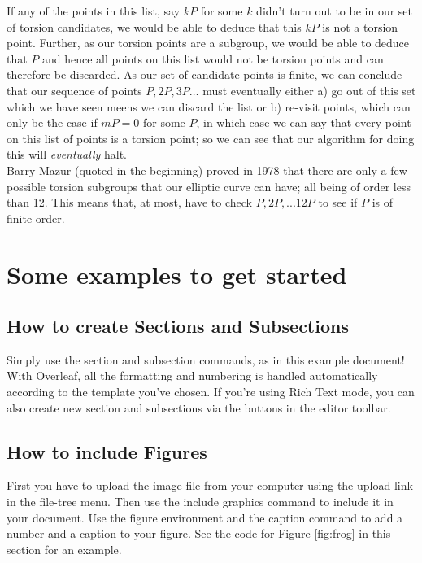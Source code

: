 \documentclass{article}
\begin{document}
If any of the points in this list, say $kP$ for some $k$ didn't turn out to be in our set of torsion candidates, we would be able to deduce that this $kP$ is not a torsion point. Further, as our torsion points are a subgroup, we would be able to deduce that $P$ and hence all points on this list would not be torsion points and can therefore be discarded. As our set of candidate points is finite, we can conclude that our sequence of points $P, 2P, 3P \dots$ must eventually either a) go out of this set which we have seen meens we can discard the list or b) re-visit points, which can only be the case if $mP = 0$ for some $P$, in which case we can say that every point on this list of points is a torsion point; so we can see that our algorithm for doing this will \emph{eventually} halt.\\

Barry Mazur (quoted in the beginning) proved in 1978 that there are only a few possible torsion subgroups that our elliptic curve can have; all being of order less than 12. This means that, at most, have to check $P, 2P, ... 12P$ to see if $P$ is of finite order.

\newpage

\section{Some examples to get started}

\subsection{How to create Sections and Subsections}

Simply use the section and subsection commands, as in this example document! With Overleaf, all the formatting and numbering is handled automatically according to the template you've chosen. If you're using Rich Text mode, you can also create new section and subsections via the buttons in the editor toolbar.

\subsection{How to include Figures}

First you have to upload the image file from your computer using the upload link in the file-tree menu. Then use the include graphics command to include it in your document. Use the figure environment and the caption command to add a number and a caption to your figure. See the code for Figure \ref{fig:frog} in this section for an example.
\end{document}
